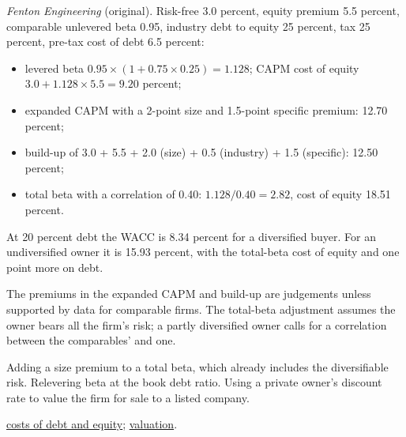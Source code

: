 \begin{qfmethod}
 \emph{Fenton Engineering} (original). Risk-free 3.0 percent, equity premium 5.5 percent, comparable unlevered beta 0.95, industry debt to equity 25 percent, tax 25 percent, pre-tax cost of debt 6.5 percent:
\begin{itemize}
\item levered beta $0.95\times(1+0.75\times0.25)=1.128$; CAPM cost of equity $3.0+1.128\times5.5=9.20$ percent;
\item expanded CAPM with a 2-point size and 1.5-point specific premium: 12.70 percent;
\item build-up of 3.0 + 5.5 + 2.0 (size) + 0.5 (industry) + 1.5 (specific): 12.50 percent;
\item total beta with a correlation of 0.40: $1.128/0.40=2.82$, cost of equity 18.51 percent.
\end{itemize}
At 20 percent debt the WACC is 8.34 percent for a diversified buyer. For an undiversified owner it is 15.93 percent, with the total-beta cost of equity and one point more on debt.

 The premiums in the expanded CAPM and build-up are judgements unless supported by data for comparable firms. The total-beta adjustment assumes the owner bears all the firm's risk; a partly diversified owner calls for a correlation between the comparables' and one.

 Adding a size premium to a total beta, which already includes the diversifiable risk. Relevering beta at the book debt ratio. Using a private owner's discount rate to value the firm for sale to a listed company.

 \hyperref[meth:cost-of-debt-equity-estimation]{costs of debt and equity}; \hyperref[meth:private-company-valuation]{valuation}.

\end{qfmethod}

